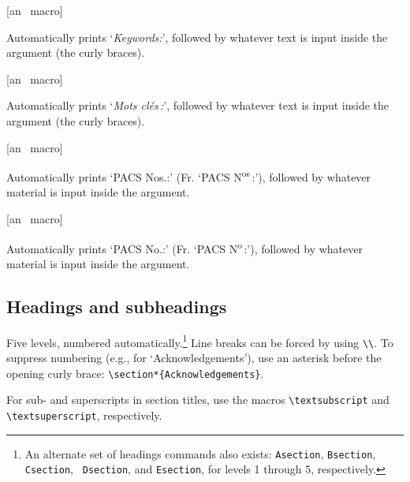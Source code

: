 \begin{description} \itemsep=0pt
   \item [{\tt \blash keywords\char`\{...\char`\}}]  \hfill [an \NRC\
      macro]\mbox{} 

         Automatically prints `\textit{Keywords:}', followed by
         whatever text is input inside the argument (the curly
         braces).

   \item [{\tt \blash motscles\char`\{...\char`\}}]  \hfill [an \NRC\
      macro]\mbox{} 

         Automatically prints `\textit{Mots cl\'es\,:}', followed by
         whatever text is input inside the argument (the curly
         braces).

   \item [{\tt \blash PACS\char`\{...\char`\}}]  \hfill [an \NRC\
      macro]\mbox{} 

         Automatically prints `PACS Nos.:' (Fr. `PACS
         N\textsuperscript{os}\,:'), followed by whatever material is
         input inside the argument.

   \item [{\tt \blash PACS*\char`\{...\char`\}}]  \hfill [an \NRC\
      macro]\mbox{} 

         Automatically prints `PACS No.:' (Fr. `PACS
         N\textsuperscript{o}\,:'), followed by whatever material is
         input inside the argument.
\end{description}


\subsection{Headings and subheadings}

Five levels, numbered automatically.\footnote{An alternate set of
headings commands also exists: \texttt{\blash Asection},
\texttt{\blash Bsection}, \texttt{\blash Csection}, \texttt{\blash
Dsection}, and \texttt{\blash Esection}, for levels 1 through 5,
respectively.} Line breaks can be forced by using \verb|\\|. To
suppress numbering (e.g., for `Acknowledgements'), use an asterisk
before the opening curly brace: \verb|\section*{Acknowledgements}|.

For sub- and superscripts in section titles, use the macros
\verb|\textsubscript| and \verb|\textsuperscript|, respectively.

